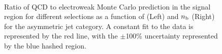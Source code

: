 \begin{figure}[h!]
\begin{center}
     ~~
     \\
      \caption{ Ratio of QCD to electroweak Monte Carlo prediction in the signal region for different \scalht selections as a function of \mht (Left) and $n_{\text{b}}$ (Right) for the asymmetric jet category. A constant fit to the data is represented by the red line, with the $\pm$100\% uncertainty represented by the blue hashed region.
    }
    \label{fig:sym_qcd_validation}
  \end{center} 
\end{figure}
